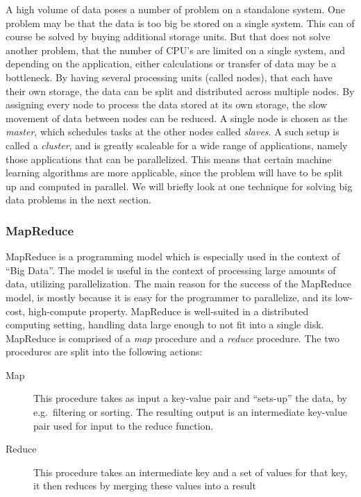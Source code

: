 A high volume of data poses a number of problem on a standalone system. One problem may be that the data is too big be stored on a single system.
This can of course be solved by buying additional storage units. But that does not solve another problem, that the number of CPU's are limited on a single system, and depending on the application, either calculations or transfer of data may be a bottleneck.
By having several processing units (called nodes), that each have their own storage, the data can be split and distributed across multiple nodes. By assigning every node to process the data stored at its own storage, the slow movement of data between nodes can be reduced.
A single node is chosen as the \textit{master}, which schedules tasks at the other nodes called \textit{slaves}. A such setup is called a \textit{cluster}, and is greatly scaleable for a wide range of applications, namely those applications that can be parallelized.
This means that certain machine learning algorithms are more applicable, since the problem will have to be split up and computed in parallel. We will briefly look at one technique for solving big data problems in the next section.

\subsubsection{MapReduce} %
\label{sec:mapreduce_programming_model}
MapReduce is a programming model which is especially used in the context of ``Big Data''. The model is useful in the context of processing large amounts of data, utilizing parallelization. The main reason for the success of the MapReduce model, is mostly because it is easy for the programmer to parallelize, and its low-cost, high-compute property. MapReduce is well-suited in a distributed computing setting, handling data large enough to not fit into a single disk.
MapReduce is comprised of a \emph{map} procedure and a \emph{reduce} procedure. The two procedures are split into the following actions:

\begin{description}
    \item[Map] This procedure takes as input a key-value pair and ``sets-up'' the data, by e.g.\ filtering or sorting. The resulting output is an intermediate key-value pair used for input to the reduce function.
    \item[Reduce] This procedure takes an intermediate key and a set of values for that key, it then reduces by merging these values into a result
\end{description}









